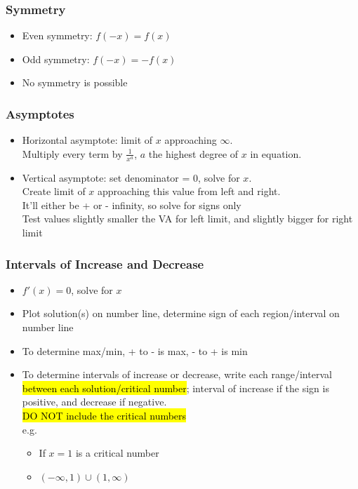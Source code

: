 \documentclass[a4paper,12pt]{article}
\begin{document}
\subsubsection{Symmetry}
\begin{itemize}
    \item{Even symmetry: $f(-x) = f(x)$}
    \item{Odd symmetry: $f(-x) = -f(x)$}
    \item{No symmetry is possible}
\end{itemize}

\subsubsection{Asymptotes}
\begin{itemize}
    \item{Horizontal asymptote: limit of $x$ approaching $\infty$. \\Multiply every term by $\frac{1}{x^a}$, $a$ the highest degree of $x$ in equation. }
    \item{Vertical asymptote: set denominator = 0, solve for $x$. \\Create limit of $x$ approaching this value from left and right. \\It'll either be + or - infinity, so solve for signs only\\ Test values slightly smaller the VA for left limit, and slightly bigger for right limit}
\end{itemize}

\subsubsection{Intervals of Increase and Decrease}
\begin{itemize}
    \item{$f'(x) = 0$, solve for $x$}
    \item{Plot solution(s) on number line, determine sign of each region/interval on number line}
    \item{To determine max/min, + to - is max, - to + is min}
    \item{
        To determine intervals of increase or decrease, write each range/interval \hl{between each solution/critical number}; interval of increase if the sign is positive, and decrease if negative.\\ \hl{DO NOT include the critical numbers}\\e.g.
        \begin{itemize}
            \item{If $x = 1$ is a critical number}
            \item{$(-\infty, 1)\cup(1, \infty)$}
        \end{itemize}
    }
\end{itemize}
\end{document}
